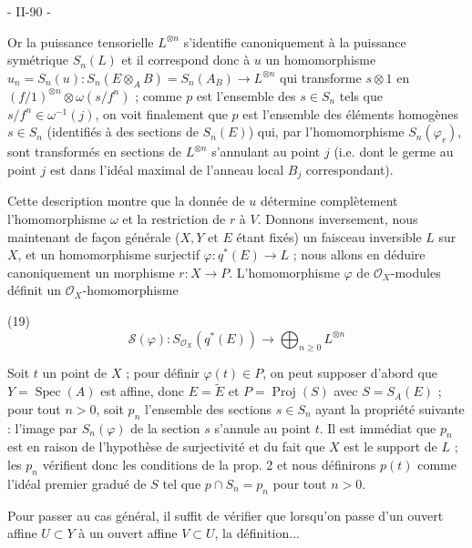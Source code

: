 
\newpage


- II-90 -

Or la puissance tensorielle $L^{\otimes n}$ s'identifie canoniquement à la puissance symétrique $S_n(L)$ et il correspond donc à $u$ un homomorphisme $u_n=S_n(u) : S_n(E \otimes_A B) = S_n(A_B) \to L^{\otimes n}$ qui transforme $s \otimes 1$ en $(f/1)^{\otimes n} \otimes \omega(s/f^n)$ ; comme $p$ est l'ensemble des $s \in S_n$ tels que $s/f^n \in \omega^{-1}(j)$, on voit finalement que $p$ est l'ensemble des éléments homogènes $s \in S_n$ (identifiés à des sections de $S_n(E)$) qui, par l'homomorphisme $S_n(\varphi_r)$, sont transformés en sections de $L^{\otimes n}$ s'annulant au point $j$ (i.e. dont le germe au point $j$ est dans l'idéal maximal de l'anneau local $B_j$ correspondant).

Cette description montre que la donnée de $u$ détermine complètement l'homomorphisme $\omega$ et la restriction de $r$ à $V$. Donnons inversement, nous maintenant de façon générale ($X, Y$ et $E$ étant fixés) un faisceau inversible $L$ sur $X$, et un homomorphisme surjectif $\varphi : q^*(E) \to L$ ; nous allons en déduire canoniquement un morphisme  $r : X \to P$. L'homomorphisme $\varphi$ de $\mathcal{O}_X$-modules définit un $\mathcal{O}_X$-homomorphisme

(19) $$\mathcal{S}(\varphi) : S_{\mathcal{O}_X}(q^*(E)) \to \bigoplus_{n \geq 0} L^{\otimes n}$$

Soit $t$ un point de $X$ ; pour définir $\varphi(t) \in P$, on peut supposer d'abord que $Y=\operatorname{Spec}(A)$ est affine, donc $E=\tilde{E}$ et $P=\operatorname{Proj}(S)$ avec $S=S_A(E)$ ; pour tout $n > 0$, soit $p_n$ l'ensemble des sections $s \in S_n$ ayant la propriété suivante : l'image par $S_n(\varphi)$ de la section $s$ s'annule au point $t$. Il est immédiat que $p_n$ est en raison de l'hypothèse de surjectivité et du fait que $X$ est le support de $L$ ; les $p_n$ vérifient donc les conditions de la prop. 2 et nous définirons $p(t)$ comme l'idéal premier gradué de $S$ tel que $p \cap S_n = p_n$ pour tout $n > 0$.

Pour passer au cas général, il suffit de vérifier que lorsqu'on passe d'un ouvert affine $U \subset Y$ à un ouvert affine $V \subset U$, la définition...

\newpage


